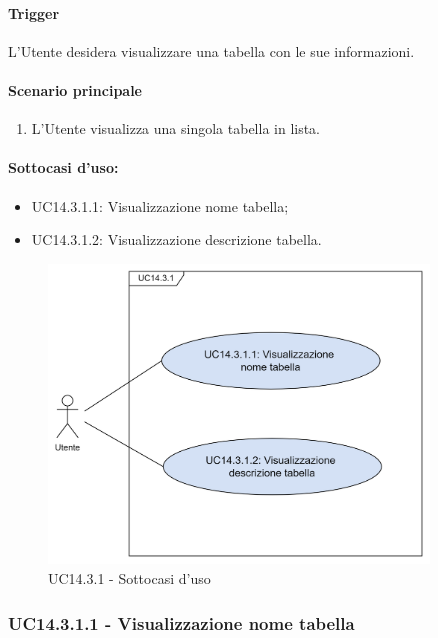 \paragraph*{Trigger}
L'Utente desidera visualizzare una tabella con le sue informazioni.

\paragraph*{Scenario principale}
\begin{enumerate}
  \item L'Utente visualizza una singola tabella in lista.
\end{enumerate}

\paragraph*{Sottocasi d'uso:}
\begin{itemize}
  \item UC14.3.1.1: Visualizzazione nome tabella;
  \item UC14.3.1.2: Visualizzazione descrizione tabella.
\end{itemize}

\begin{figure}[H]
  \centering
  \includegraphics[width=0.90\textwidth]{assets/uc14_3_1_1.png}
  \caption{UC14.3.1 - Sottocasi d'uso}
\end{figure}


\subsubsection{UC14.3.1.1 - Visualizzazione nome tabella}\label{UC14point3point1point1}
